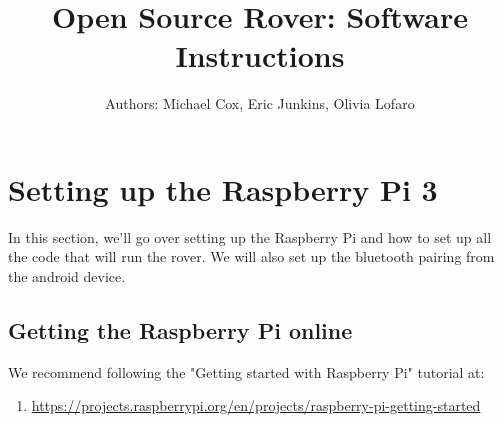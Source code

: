 \documentclass[12pt]{article}
\begin{document}
\title{Open Source Rover: Software Instructions}
\author{Authors: Michael Cox, Eric Junkins, Olivia Lofaro}

\makeatletter         
\def\@maketitle{
\begin{center}	
	\makebox[\textwidth][c]{ \texttt{[image: "Pictures/software title".png]}}
	{\Huge \bfseries \sffamily \@title }\\[3ex] 
	{\Large\sffamily \@author}\\[3ex] 
	\texttt{[image: "Pictures/JPL logo".png]}
\end{center}}
\makeatother

\maketitle


\newpage


\tableofcontents

\newpage


\section{Setting up the Raspberry Pi 3}
In this section, we'll go over setting up the Raspberry Pi and how to set up all the code that will run the rover. We will also set up the bluetooth pairing from the android device.
\subsection{Getting the Raspberry Pi online}

We recommend following the "Getting started with Raspberry Pi" tutorial at:

\begin{enumerate}
	\item[] \href{https://projects.raspberrypi.org/en/projects/raspberry-pi-getting-started}{https://projects.raspberrypi.org/en/projects/raspberry-pi-getting-started}
\end{enumerate}
\end{document}
